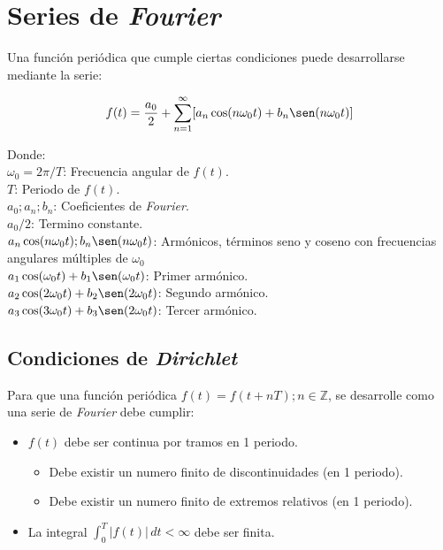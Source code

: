 \section{Series de \emph{Fourier}}
Una función periódica  que cumple ciertas condiciones puede desarrollarse
mediante la serie:

\begin{equation}
    f(t)=\frac{a_0}{2}+
    \sum_{n=1}^{\infty}[a_n\cos(n\omega_0 t)+b_n\sen(n\omega_0 t)]
\end{equation}

Donde:\\
\indent\indent$\omega_0=2\pi/T$: Frecuencia angular de $f(t)$.\\
\indent\indent$T$: Periodo de $f(t)$.\\
\indent\indent$a_0; a_n; b_n$: Coeficientes de \emph{Fourier}.\\
\indent\indent$a_0/2$: Termino constante.\\
\indent\indent$a_n\cos(n\omega_0 t);b_n\sen(n\omega_0 t)$: Armónicos, términos
seno y coseno con frecuencias angulares múltiples de $\omega_0$\\

\indent\indent$a_1\cos( \omega_0 t)+b_1\sen( \omega_0 t)$: Primer armónico.\\
\indent\indent$a_2\cos(2\omega_0 t)+b_2\sen(2\omega_0 t)$: Segundo armónico.\\
\indent\indent$a_3\cos(3\omega_0 t)+b_3\sen(2\omega_0 t)$: Tercer armónico.\\

\subsection{Condiciones de \emph{Dirichlet}}
Para que una función periódica $f(t)=f(t+nT); n\in\mathbb{Z}$, se desarrolle
como una serie de \emph{Fourier} debe cumplir:

\begin{itemize}
\item $f(t)$ debe ser continua por tramos en 1 periodo.
    \begin{figure}[H]
        \centering
        
    \end{figure}

    \begin{itemize}
    \item Debe existir un numero finito de discontinuidades (en 1 periodo).
    \item Debe existir un numero finito de extremos relativos (en 1 periodo).
    \end{itemize}
\item La integral $\int_0^T |f(t)|\,dt<\infty$ debe ser finita.
\end{itemize}

